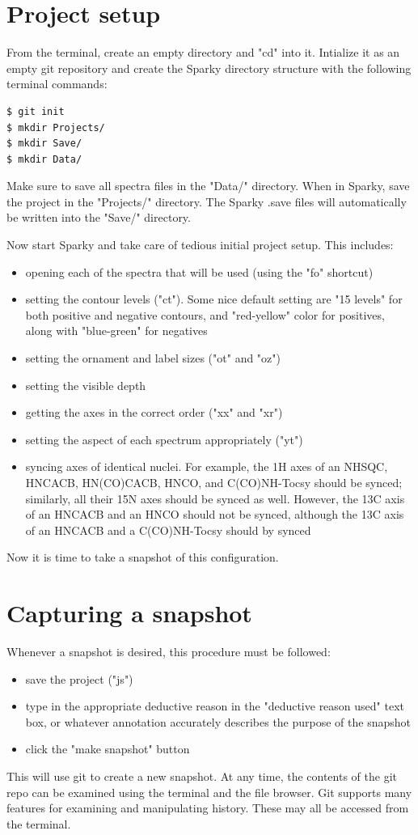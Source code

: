 \section{Project setup}
From the terminal, create an empty directory and "cd" into it.
Intialize it as an empty git repository and create the Sparky directory
structure with the following terminal commands:
\begin{verbatim}
$ git init
$ mkdir Projects/
$ mkdir Save/
$ mkdir Data/
\end{verbatim} 
Make sure to save all spectra files in the "Data/" directory.
When in Sparky, save the project in the "Projects/" directory.
The Sparky .save files will automatically be written into the "Save/"
directory.

Now start Sparky and take care of tedious initial project setup.  This includes:
\begin{itemize}
  \item opening each of the spectra that will be used (using the "fo" shortcut)
  \item setting the contour levels ("ct").  Some nice default setting are
    "15 levels" for both positive and negative contours, and "red-yellow" color
    for positives, along with "blue-green" for negatives
  \item setting the ornament and label sizes ("ot" and "oz")
  \item setting the visible depth
  \item getting the axes in the correct order ("xx" and "xr")
  \item setting the aspect of each spectrum appropriately ("yt")
  \item syncing axes of identical nuclei.  For example, the 1H axes of
    an NHSQC, HNCACB, HN(CO)CACB, HNCO, and C(CO)NH-Tocsy should be synced; 
    similarly, all their 15N axes should be synced as well.  However, the
    13C axis of an HNCACB and an HNCO should not be synced, although the
    13C axis of an HNCACB and a C(CO)NH-Tocsy should by synced
\end{itemize}
Now it is time to take a snapshot of this configuration.

\section{Capturing a snapshot}
Whenever a snapshot is desired, this procedure must be followed:
\begin{itemize}
  \item save the project ("js")
  \item type in the appropriate deductive reason in the "deductive reason used"
    text box, or whatever annotation accurately describes the purpose of the 
    snapshot
  \item click the "make snapshot" button
\end{itemize}
This will use git to create a new snapshot.  At any time, the contents of
the git repo can be examined using the terminal and the file browser.  Git
supports many features for examining and manipulating history.  These may
all be accessed from the terminal.


